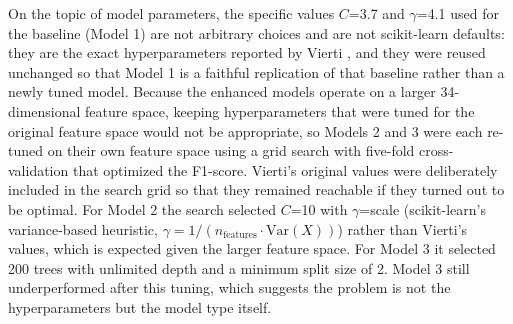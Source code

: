 \documentclass[conference]{IEEEtran}
\begin{document}
On the topic of model parameters, the specific values $C$=3.7 and $\gamma$=4.1 used for the baseline (Model 1) are not arbitrary choices and are not scikit-learn defaults: they are the exact hyperparameters reported by Vierti \cite{vierti2019}, and they were reused unchanged so that Model 1 is a faithful replication of that baseline rather than a newly tuned model. Because the enhanced models operate on a larger 34-dimensional feature space, keeping hyperparameters that were tuned for the original feature space would not be appropriate, so Models 2 and 3 were each re-tuned on their own feature space using a grid search with five-fold cross-validation that optimized the F1-score. Vierti's original values were deliberately included in the search grid so that they remained reachable if they turned out to be optimal. For Model 2 the search selected $C$=10 with $\gamma$=scale (scikit-learn's variance-based heuristic, $\gamma = 1/(n_\text{features}\cdot\text{Var}(X))$) rather than Vierti's values, which is expected given the larger feature space. For Model 3 it selected 200 trees with unlimited depth and a minimum split size of 2. Model 3 still underperformed after this tuning, which suggests the problem is not the hyperparameters but the model type itself.
\end{document}
